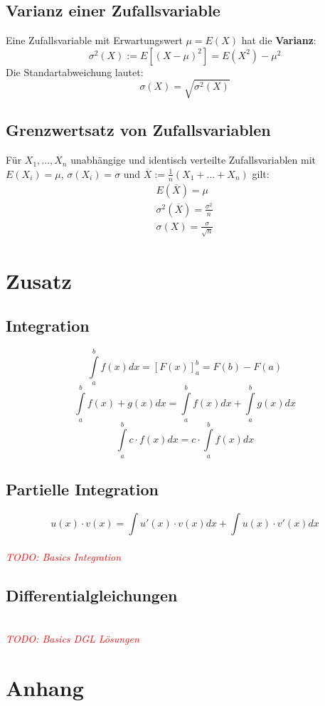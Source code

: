 \documentclass[12pt]{article}
\newcommand\todo[1]{\textit{\textcolor{red}{\\TODO: #1}}}
\begin{document}
\subsection{Varianz einer Zufallsvariable}
Eine Zufallsvariable mit Erwartungswert $\mu = E(X)$ hat die \textbf{Varianz}:
\begin{equation}
	\sigma^2(X):=E[(X-\mu)^2]=E(X^2)-\mu^2
\end{equation}
Die Standartabweichung lautet:
\begin{equation}
	\sigma(X) = \sqrt{\sigma^2(X)}
\end{equation}
\subsection{Grenzwertsatz von Zufallsvariablen}
Für $X_1,...,X_n$ unabhängige und identisch verteilte Zufallsvariablen mit $E(X_i)=\mu$, $\sigma(X_i)=\sigma$ und $\overline{X}:=\frac{1}{n}(X_1+...+X_n)$ gilt:
\begin{align}
	E(\overline{X})=\mu \\
	\sigma^2(\overline{X})=\frac{\sigma^2}{n}\\
	\sigma(X)=\frac{\sigma}{\sqrt{n}}
\end{align}
\section{Zusatz}
\subsection{Integration}
\begin{equation}
	\int\limits_{a}^{b}f(x) dx = [F(x)]_a^b = F(b) - F(a)
\end{equation}
\begin{equation}
	\int\limits_{a}^{b}f(x) + g(x) dx = \int\limits_{a}^{b}f(x) dx + \int\limits_{a}^{b}g(x) dx
\end{equation}
\begin{equation}
	\int\limits_{a}^{b}c\cdot f(x) dx = c\cdot \int\limits_{a}^{b}f(x) dx
\end{equation}
\subsection{Partielle Integration}
\begin{equation}
	u(x)\cdot v(x) = \int u'(x) \cdot v(x) dx + \int u(x) \cdot v'(x) dx
\end{equation}
\todo{Basics Integration}
\subsection{Differentialgleichungen}
\todo{Basics DGL Lösungen}
\newpage
{}
\section{Anhang}
\printbibliography[heading=subbibnumbered]
\end{document}
